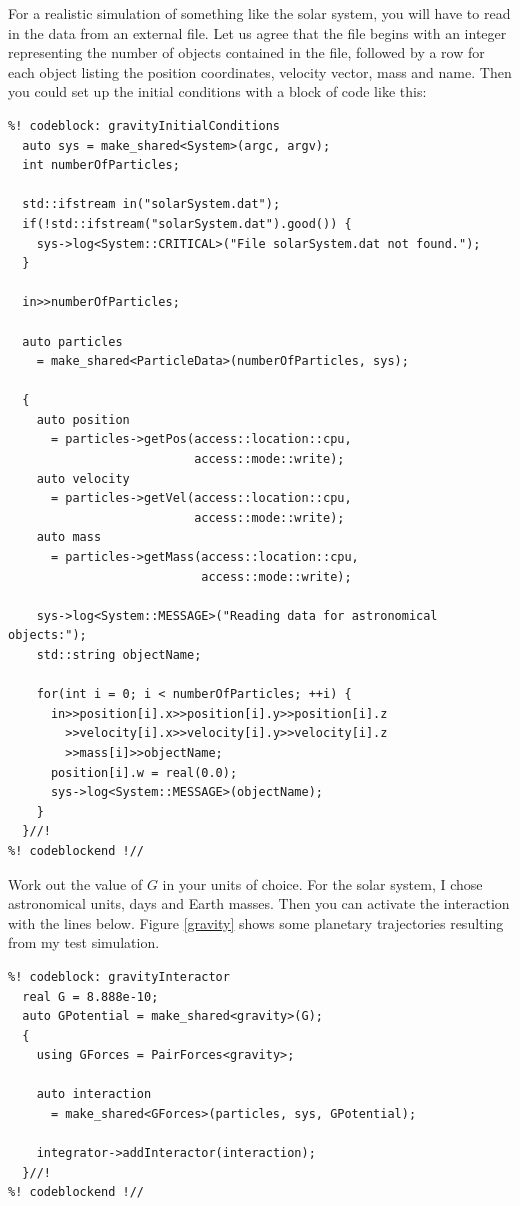 For a realistic simulation of something like the solar system, you will have to 
read in the data from an external file. Let us agree that the file begins with 
an integer representing the number of objects contained in the file, followed by 
a row for each object listing the position coordinates, velocity vector, mass 
and name. Then you could set up the initial conditions with a block of code like 
this:
\begin{lstlisting}
%! codeblock: gravityInitialConditions
  auto sys = make_shared<System>(argc, argv);
  int numberOfParticles;

  std::ifstream in("solarSystem.dat");
  if(!std::ifstream("solarSystem.dat").good()) {
    sys->log<System::CRITICAL>("File solarSystem.dat not found.");
  }

  in>>numberOfParticles;

  auto particles
    = make_shared<ParticleData>(numberOfParticles, sys);

  {
    auto position
      = particles->getPos(access::location::cpu,
                          access::mode::write);
    auto velocity
      = particles->getVel(access::location::cpu,
                          access::mode::write);
    auto mass
      = particles->getMass(access::location::cpu,
                           access::mode::write);

    sys->log<System::MESSAGE>("Reading data for astronomical objects:");
    std::string objectName;

    for(int i = 0; i < numberOfParticles; ++i) {
      in>>position[i].x>>position[i].y>>position[i].z
        >>velocity[i].x>>velocity[i].y>>velocity[i].z
        >>mass[i]>>objectName;
      position[i].w = real(0.0);
      sys->log<System::MESSAGE>(objectName);
    }
  }//!
%! codeblockend !//
\end{lstlisting}

Work out the value of $G$ in your units of choice. For the solar system, I chose 
astronomical units, days and Earth masses. Then you can activate the interaction 
with the lines below. Figure \ref{gravity} shows some planetary trajectories 
resulting from my test simulation.
\begin{lstlisting}
%! codeblock: gravityInteractor
  real G = 8.888e-10;
  auto GPotential = make_shared<gravity>(G);
  {
    using GForces = PairForces<gravity>;

    auto interaction
      = make_shared<GForces>(particles, sys, GPotential);

    integrator->addInteractor(interaction);
  }//!
%! codeblockend !//
\end{lstlisting}

